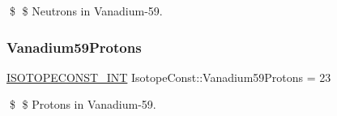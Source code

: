 \$ \$ Neutrons in Vanadium-\/59. \mbox{\label{group___isotope_const-_vanadium-_v59_ga11f00b82e1a51a5f37f7ca35128c8087}} 
\subsubsection{\texorpdfstring{Vanadium59\+Protons}{Vanadium59Protons}}
{\footnotesize\ttfamily \mbox{\hyperlink{group___isotope_const-_macros_ga5f18360b3e99483a35c32d789e62621c}{I\+S\+O\+T\+O\+P\+E\+C\+O\+N\+S\+T\+\_\+\+I\+NT}} Isotope\+Const\+::\+Vanadium59\+Protons = 23}

\$ \$ Protons in Vanadium-\/59. 